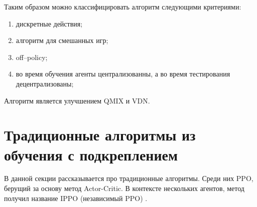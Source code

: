 Таким образом можно классифицировать алгоритм следующими критериями:
\begin{enumerate}[label={\arabic*)}]
	\item дискретные действия;
	\item алгоритм для смешанных игр;
	\item off--policy;
	\item во время обучения агенты централизованны, а во время тестирования децентрализованы;
\end{enumerate}

Алгоритм является улучшением QMIX и VDN.


% 
% 
% 

\section{Традиционные алгоритмы из обучения с подкреплением}

В данной секции рассказывается про традиционные алгоритмы. 
Среди них PPO, берущий за основу метод Actor-Critic. В контексте нескольких агентов, метод получил название IPPO (независимый PPO) \cite{DBLP:journals/corr/abs-2103-01955}.

